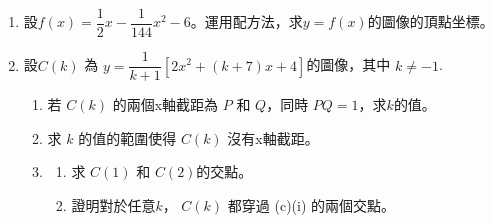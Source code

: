 \documentclass[11pt]{article}
\begin{document}
    \begin{enumerate}
        \item 設$f(x)=\dfrac{1}{2}x-\dfrac{1}{144}x^2-6$。運用配方法，求$y=f(x)$的圖像的頂點坐標。
        
            \hrulefill
                
            \hrulefill
            
            \hrulefill
        
            \hrulefill
            
            \hrulefill
                
            \hrulefill
            
            \hrulefill
                
            \hrulefill
            
            \hrulefill
            
            \hrulefill
            
            \hrulefill
            
            \hrulefill
            
            \hrulefill
            
            \hrulefill
            
            \hrulefill
            
            \hrulefill
            
            \hrulefill
            
            \hrulefill
            
            \hrulefill
            
            \hrulefill
            
            \hrulefill
            
            \hrulefill
            
            \hrulefill
            
            \hrulefill
            
            \hrulefill
            
            \hrulefill
            
            \hrulefill
            
            \hrulefill
            
            \hrulefill

        \pagebreak
        \item 設$C(k)$ 為 $y=\dfrac{1}{k+1}[2x^2+(k+7)x+4]$的圖像，其中 $k\neq -1$.\begin{enumerate}
            \item 若 $C(k)$ 的兩個x軸截距為 $P$ 和 $Q$，同時 $PQ=1$，求$k$的值。
            \item 求 $k$ 的值的範圍使得 $C(k)$ 沒有x軸截距。
            \item \begin{enumerate}
                \item 求 $C(1)$ 和 $C(2)$的交點。
                \item 證明對於任意$k$， $C(k)$ 都穿過 (c)(i) 的兩個交點。 
            \end{enumerate} 
        \end{enumerate}
        

\end{enumerate}
\end{document}
